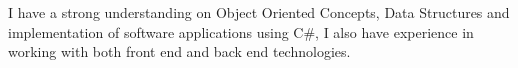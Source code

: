 

\begin{cvparagraph}
I have a strong understanding on Object Oriented Concepts, Data Structures and implementation of software applications using C\#, I also have experience in working with both front end and back end technologies.
\end{cvparagraph}
